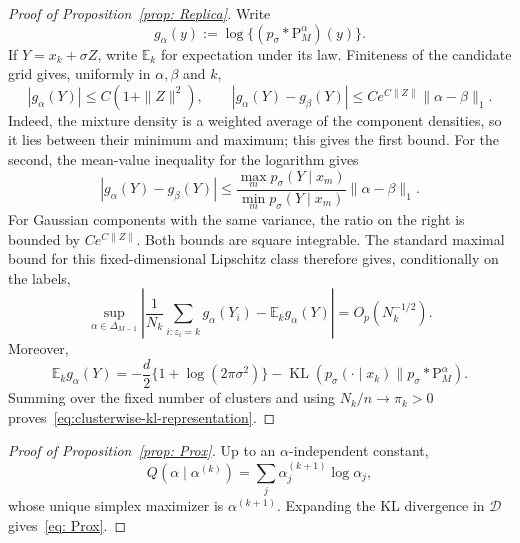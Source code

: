 \documentclass[12pt]{iopart}
\theoremstyle{remark}
\begin{document}
\begin{proof}[Proof of Proposition~\ref{prop: Replica}]
Write
\[
g_\alpha(y):=\log\{(p_\sigma*\mathrm P_M^\alpha)(y)\}.
\]
If $Y=x_k+\sigma Z$, write $\mathbb E_k$ for expectation under its law.
Finiteness of the candidate grid gives, uniformly in $\alpha,\beta$ and $k$,
\[
|g_\alpha(Y)|\leq C(1+\|Z\|^2),
\qquad
|g_\alpha(Y)-g_\beta(Y)|
\leq Ce^{C\|Z\|}\|\alpha-\beta\|_1.
\]
Indeed, the mixture density is a weighted average of the component densities,
so it lies between their minimum and maximum; this gives the first bound. For
the second, the mean-value inequality for the logarithm gives
\[
|g_\alpha(Y)-g_\beta(Y)|
\leq
\frac{\max_m p_\sigma(Y\mid x_m)}{\min_m p_\sigma(Y\mid x_m)}
\|\alpha-\beta\|_1.
\]
For Gaussian components with the same variance, the ratio on the right is
bounded by $Ce^{C\|Z\|}$. Both bounds are square integrable. The standard
maximal bound for this fixed-dimensional Lipschitz class therefore gives,
conditionally on the labels,
\[
\sup_{\alpha\in\Delta_{M-1}}
\left|
\frac1{N_k}\sum_{i:z_i=k}g_\alpha(Y_i)
-\mathbb E_k g_\alpha(Y)
\right|=O_p(N_k^{-1/2}).
\]
Moreover,
\[
\mathbb E_k g_\alpha(Y)
=-\frac d2\{1+\log(2\pi\sigma^2)\}
-\operatorname{KL}\!\left(p_\sigma(\cdot\mid x_k)\|
p_\sigma*\mathrm P_M^\alpha\right).
\]
Summing over the fixed number of clusters and using
$N_k/n\to\pi_k>0$ proves~\eqref{eq:clusterwise-kl-representation}.
\end{proof}


\begin{proof}[Proof of Proposition~\ref{prop: Prox}]
Up to an $\alpha$-independent constant,
\[
Q(\alpha\mid\alpha^{(k)})
=\sum_j\alpha_j^{(k+1)}\log\alpha_j,
\]
whose unique simplex maximizer is $\alpha^{(k+1)}$. Expanding the KL
divergence in $\mathcal D$ gives~\eqref{eq: Prox}.
\end{proof}
\end{document}

